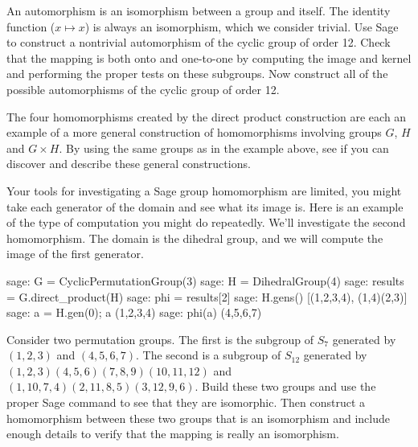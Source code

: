 \begin{sageverbatim}\end{sageverbatim}
%
%
An automorphism is an isomorphism between a group and itself.  The identity function ($x\mapsto x$) is always an isomorphism, which we consider trivial.  Use Sage to construct a nontrivial automorphism of the cyclic group of order 12.  Check that the mapping is both onto and one-to-one by computing the image and kernel and performing the proper tests on these subgroups.  Now construct all of the possible automorphisms of the cyclic group of order 12.
\begin{sageverbatim}\end{sageverbatim}
%
%
The four homomorphisms created by the direct product construction are each an example of a more general construction of homomorphisms involving groups $G$, $H$ and $G\times H$.  By using the same groups as in the example above, see if you can discover and describe these general constructions.\par
%
Your tools for investigating a Sage group homomorphism are limited, you might take each generator of the domain and see what its image is.  Here is an example of the type of computation you might do repeatedly.  We'll investigate the second homomorphism.  The domain is the dihedral group, and we will compute the image of the first generator.
%
\begin{sageexample}
sage: G = CyclicPermutationGroup(3)
sage: H = DihedralGroup(4)
sage: results = G.direct_product(H)
sage: phi = results[2]
sage: H.gens()
[(1,2,3,4), (1,4)(2,3)]
sage: a = H.gen(0); a
(1,2,3,4)
sage: phi(a)
(4,5,6,7)
\end{sageexample}
%
\begin{sageverbatim}\end{sageverbatim}
%
%
Consider two permutation groups.  The first is the subgroup of $S_7$ generated by $(1, 2, 3)$ and $(4, 5, 6, 7)$.  The second is a subgroup of $S_{12}$ generated by $(1, 2, 3)(4, 5, 6)(7, 8, 9)(10, 11, 12)$ and $(1, 10, 7, 4)(2, 11, 8, 5)(3, 12, 9, 6)$.  Build these two groups and use the proper Sage command to see that they are isomorphic.  Then construct a homomorphism between these two groups that is an isomorphism and include enough details to verify that the mapping is really an isomorphism.
